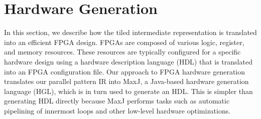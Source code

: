 \section{Hardware Generation}
\label{hardware}

In this section, we describe how the tiled intermediate representation is translated into an efficient FPGA design.
FPGAs are composed of various logic, register, and memory resources.
These resources are typically configured for a specific hardware design using a hardware description language (HDL) that is translated into an FPGA configuration file.
Our approach to FPGA hardware generation translates our parallel pattern IR into MaxJ, a Java-based hardware generation language (HGL), which is in turn used to generate an HDL.
This is simpler than generating HDL directly because MaxJ performs tasks such as automatic pipelining of innermost loops and other low-level hardware optimizations.









